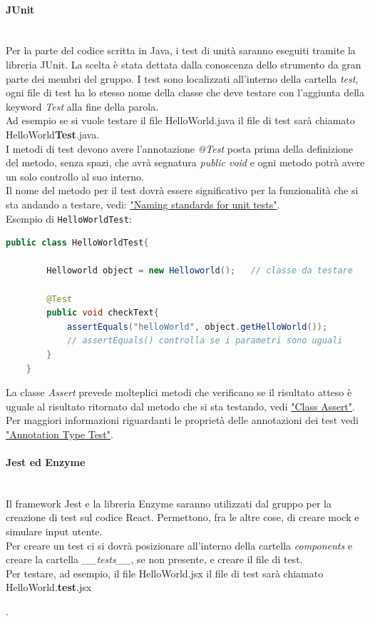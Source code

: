 {\paragraph{JUnit}\mbox{}\\
Per la parte del codice scritta in Java, i test di unità saranno eseguiti tramite la libreria JUnit. La scelta è stata dettata dalla conoscenza dello strumento da gran parte dei membri del gruppo.
I test sono localizzati all'interno della cartella \textit{test}, ogni file di test ha lo stesso nome della classe che deve testare con l'aggiunta della keyword \textit{Test} alla fine della parola. \\
Ad esempio se si vuole testare il file HelloWorld.java il file di test sarà chiamato HelloWorld\textbf{Test}.java. \\
I metodi di test devono avere l'annotazione \textit{@Test} posta prima della definizione del metodo, senza spazi, che avrà segnatura \textit{public void} e ogni metodo potrà avere un solo controllo al suo interno.\\
Il nome del metodo per il test dovrà essere significativo per la funzionalità che si sta andando a testare, vedi: \href{https://osherove.com/blog/2005/4/3/naming-standards-for-unit-tests.html}{"Naming standards for unit tests"}.\\
Esempio di \texttt{HelloWorldTest}: 
\begin{lstlisting}[language=Java]
	public class HelloWorldTest{
	
		Helloworld object = new Helloworld();	// classe da testare
		
		@Test
		public void checkText{
			assertEquals("helloWorld", object.getHelloWorld());		
			// assertEquals() controlla se i parametri sono uguali
		}
	}
\end{lstlisting}
La classe \textit{Assert} prevede molteplici metodi che verificano se il risultato atteso è uguale al risultato ritornato dal metodo che si sta testando, vedi \href{https://junit.org/junit4/javadoc/4.12/org/junit/Assert.html}{"Class Assert"}.\\
Per maggiori informazioni riguardanti le proprietà delle annotazioni dei test vedi \href{https://junit.org/junit4/javadoc/latest/org/junit/Test.html}{"Annotation Type Test"}.


\paragraph{Jest ed Enzyme}\mbox{}\\
Il framework Jest e la libreria Enzyme saranno utilizzati dal gruppo per la creazione di test sul codice React. Permettono, fra le altre cose, di creare mock e simulare input utente. \\
Per creare un test ci si dovrà posizionare all'interno della cartella \textit{components} e creare la cartella \textit{\_\_tests\_\_}, se non presente, e creare il file di test. \\
Per testare, ad esempio, il file HelloWorld.jsx il file di test sarà chiamato HelloWorld.\textbf{test}.jsx}.
